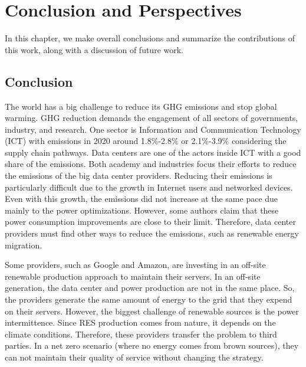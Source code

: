 \chapter{Conclusion and Perspectives}
\label{cha:conclusion}

In this chapter, we make overall conclusions and summarize the contributions of this work, along with a discussion of future work.

\section{Conclusion}

The world has a big challenge to reduce its GHG emissions and stop global warming. GHG reduction demands the engagement of all sectors of governments, industry, and research. One sector is Information and Communication Technology (ICT) with emissions in 2020 around 1.8\%-2.8\% or 2.1\%-3.9\% considering the supply chain pathways. Data centers are one of the actors inside ICT with a good share of the emissions. Both academy and industries focus their efforts to reduce the emissions of the big data center providers. Reducing their emissions is particularly difficult due to the growth in Internet users and networked devices. Even with this growth, the emissions did not increase at the same pace due mainly to the power optimizations. However, some authors claim that these power consumption improvements are close to their limit. Therefore, data center providers must find other ways to reduce the emissions, such as renewable energy migration.

Some providers, such as Google and Amazon, are investing in an off-site renewable production approach to maintain their servers. In an off-site generation, the data center and power production are not in the same place. So, the providers generate the same amount of energy to the grid that they expend on their servers. However, the biggest challenge of renewable sources is the power intermittence. Since RES production comes from nature, it depends on the climate conditions. Therefore, these providers transfer the problem to third parties. In a net zero scenario (where no energy comes from brown sources), they can not maintain their quality of service without changing the strategy. 

